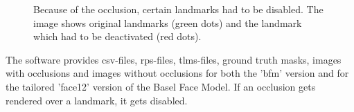 \begin{figure}
	\hspace*{\fill}%
	\hfill
	\hspace*{\fill}%
	\caption{Because of the occlusion, certain landmarks had to be disabled. The image shows original landmarks (green dots) and the landmark which had to be deactivated (red dots).}
	\label{appendix:lms}
\end{figure}

The software provides csv-files, rps-files, tlms-files, ground truth masks, images with occlusions and images without occlusions for both the 'bfm' version and for the tailored 'face12' version of the Basel Face Model. If an occlusion gets rendered over a landmark, it gets disabled.